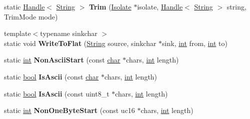 \begin{DoxyCompactItemize}
\item 
\mbox{\label{classv8_1_1internal_1_1String_a9b41ef6aa1583dc269ccf059298a2b45}} 
static \mbox{\hyperlink{classv8_1_1internal_1_1Handle}{Handle}}$<$ \mbox{\hyperlink{classv8_1_1internal_1_1String}{String}} $>$ {\bfseries Trim} (\mbox{\hyperlink{classv8_1_1internal_1_1Isolate}{Isolate}} $\ast$isolate, \mbox{\hyperlink{classv8_1_1internal_1_1Handle}{Handle}}$<$ \mbox{\hyperlink{classv8_1_1internal_1_1String}{String}} $>$ string, Trim\+Mode mode)
\item 
\mbox{\label{classv8_1_1internal_1_1String_a9874b903a6b7c4ffc789d0543c6fc171}} 
{\footnotesize template$<$typename sinkchar $>$ }\\static void {\bfseries Write\+To\+Flat} (\mbox{\hyperlink{classv8_1_1internal_1_1String}{String}} source, sinkchar $\ast$sink, \mbox{\hyperlink{classint}{int}} from, \mbox{\hyperlink{classint}{int}} to)
\item 
\mbox{\label{classv8_1_1internal_1_1String_a1d5c14238cade24eaa92c57856deb69f}} 
static \mbox{\hyperlink{classint}{int}} {\bfseries Non\+Ascii\+Start} (const \mbox{\hyperlink{classchar}{char}} $\ast$chars, \mbox{\hyperlink{classint}{int}} length)
\item 
\mbox{\label{classv8_1_1internal_1_1String_af725d9dc277683fa4486a928348ba75a}} 
static \mbox{\hyperlink{classbool}{bool}} {\bfseries Is\+Ascii} (const \mbox{\hyperlink{classchar}{char}} $\ast$chars, \mbox{\hyperlink{classint}{int}} length)
\item 
\mbox{\label{classv8_1_1internal_1_1String_a4960adf7c08c3c7f4ff6cb3091341288}} 
static \mbox{\hyperlink{classbool}{bool}} {\bfseries Is\+Ascii} (const uint8\+\_\+t $\ast$chars, \mbox{\hyperlink{classint}{int}} length)
\item 
\mbox{\label{classv8_1_1internal_1_1String_a803ee7a24653b9b58b659b346e063b52}} 
static \mbox{\hyperlink{classint}{int}} {\bfseries Non\+One\+Byte\+Start} (const uc16 $\ast$chars, \mbox{\hyperlink{classint}{int}} length)
\item 
\mbox{\label{classv8_1_1internal_1_1String_ac6716eabda6922785064cd84ce169f0d}} 

\end{DoxyCompactItemize}
